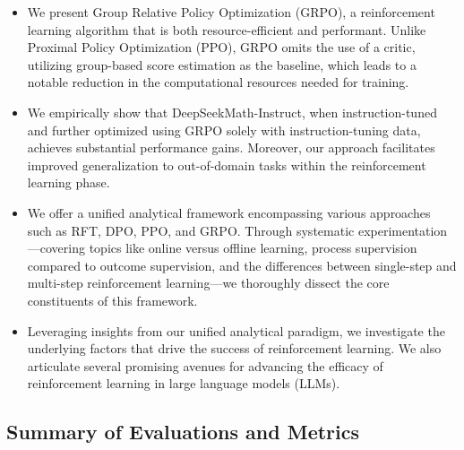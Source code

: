 \begin{itemize}[topsep=0pt]
    \item We present Group Relative Policy Optimization (GRPO), a reinforcement learning algorithm that is both resource-efficient and performant. Unlike Proximal Policy Optimization (PPO), GRPO omits the use of a critic, utilizing group-based score estimation as the baseline, which leads to a notable reduction in the computational resources needed for training.
    \item We empirically show that DeepSeekMath-Instruct, when instruction-tuned and further optimized using GRPO solely with instruction-tuning data, achieves substantial performance gains. Moreover, our approach facilitates improved generalization to out-of-domain tasks within the reinforcement learning phase.
    \item We offer a unified analytical framework encompassing various approaches such as RFT, DPO, PPO, and GRPO. Through systematic experimentation—covering topics like online versus offline learning, process supervision compared to outcome supervision, and the differences between single-step and multi-step reinforcement learning—we thoroughly dissect the core constituents of this framework.
    \item Leveraging insights from our unified analytical paradigm, we investigate the underlying factors that drive the success of reinforcement learning. We also articulate several promising avenues for advancing the efficacy of reinforcement learning in large language models (LLMs).
\end{itemize}

\subsection{Summary of Evaluations and Metrics}

